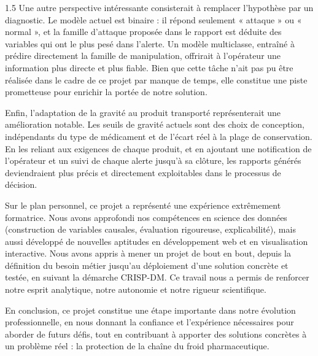 \begin{spacing}{1.5}
Une autre perspective intéressante consisterait à remplacer l'hypothèse par un
diagnostic. Le modèle actuel est binaire : il répond seulement « attaque » ou
« normal », et la famille d'attaque proposée dans le rapport est déduite des
variables qui ont le plus pesé dans l'alerte. Un modèle multiclasse, entraîné à
prédire directement la famille de manipulation, offrirait à l'opérateur une
information plus directe et plus fiable. Bien que cette tâche n'ait pas pu être
réalisée dans le cadre de ce projet par manque de temps, elle constitue une piste
prometteuse pour enrichir la portée de notre solution.

Enfin, l'adaptation de la gravité au produit transporté représenterait une
amélioration notable. Les seuils de gravité actuels sont des choix de conception,
indépendants du type de médicament et de l'écart réel à la plage de conservation.
En les reliant aux exigences de chaque produit, et en ajoutant une notification
de l'opérateur et un suivi de chaque alerte jusqu'à sa clôture, les rapports
générés deviendraient plus précis et directement exploitables dans le processus
de décision.

Sur le plan personnel, ce projet a représenté une expérience extrêmement
formatrice. Nous avons approfondi nos compétences en science des données
(construction de variables causales, évaluation rigoureuse, explicabilité),
mais aussi développé de nouvelles aptitudes en développement web et en
visualisation interactive. Nous avons appris à mener un projet de bout en bout,
depuis la définition du besoin métier jusqu'au déploiement d'une solution
concrète et testée, en suivant la démarche CRISP-DM. Ce travail nous a permis de
renforcer notre esprit analytique, notre autonomie et notre rigueur scientifique.

En conclusion, ce projet constitue une étape importante dans notre évolution
professionnelle, en nous donnant la confiance et l'expérience nécessaires pour
aborder de futurs défis, tout en contribuant à apporter des solutions concrètes
à un problème réel : la protection de la chaîne du froid pharmaceutique.

\end{spacing}

